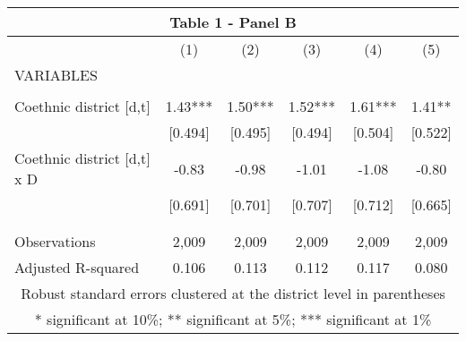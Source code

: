 \begin{tabular}{lccccc}
\multicolumn{6}{c}{Table 1 - Panel B} \\ \hline
 & (1) & (2) & (3) & (4) & (5) \\
VARIABLES &  &  &  &  &  \\ \hline
 &  &  &  &  &  \\
Coethnic district [d,t] & 1.43*** & 1.50*** & 1.52*** & 1.61*** & 1.41** \\
 & [0.494] & [0.495] & [0.494] & [0.504] & [0.522] \\
Coethnic district [d,t] x D & -0.83 & -0.98 & -1.01 & -1.08 & -0.80 \\
 & [0.691] & [0.701] & [0.707] & [0.712] & [0.665] \\
 &  &  &  &  &  \\
 &  &  &  &  &  \\
Observations & 2,009 & 2,009 & 2,009 & 2,009 & 2,009 \\
 Adjusted R-squared & 0.106 & 0.113 & 0.112 & 0.117 & 0.080 \\ \hline
\multicolumn{6}{c}{ Robust standard errors clustered at the district level in parentheses} \\
\multicolumn{6}{c}{ * significant at 10\%; ** significant at 5\%; *** significant at 1\%} \\
\end{tabular}
